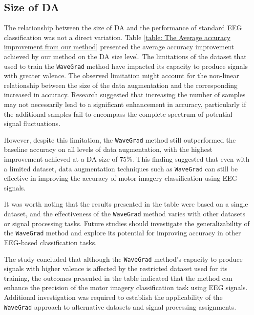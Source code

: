 \documentclass[runningheads]{llncs}
\begin{document}
\subsection{Size of DA}
 The relationship between the size of DA and the performance of standard EEG classification was not a direct variation. Table \ref{table: The Average accuracy improvement from our method} presented the average accuracy improvement achieved by our method on the DA size level. The limitations of the dataset that used to train the \texttt{WaveGrad} method have impacted its capacity to produce signals with greater valence. The observed limitation might account for the non-linear relationship between the size of the data augmentation and the corresponding increased in accuracy. Research suggested that increasing the number of samples may not necessarily lead to a significant enhancement in accuracy, particularly if the additional samples fail to encompass the complete spectrum of potential signal fluctuations.


However, despite this limitation, the \texttt{WaveGrad} method still outperformed the baseline accuracy on all levels of data augmentation, with the highest improvement achieved at a DA size of 75\%. This finding suggested that even with a limited dataset, data augmentation techniques such as \texttt{WaveGrad} can still be effective in improving the accuracy of motor imagery classification using EEG signals.

It was worth noting that the results presented in the table were based on a single dataset, and the effectiveness of the \texttt{WaveGrad} method varies with other datasets or signal processing tasks. Future studies should investigate the generalizability of the \texttt{WaveGrad} method and explore its potential for improving accuracy in other EEG-based classification tasks.

The study concluded that although the \texttt{WaveGrad} method's capacity to produce signals with higher valence is affected by the restricted dataset used for its training, the outcomes presented in the table indicated that the method can enhance the precision of the motor imagery classification task using EEG signals. Additional investigation was required to establish the applicability of the \texttt{WaveGrad} approach to alternative datasets and signal processing assignments.


 
\end{document}
